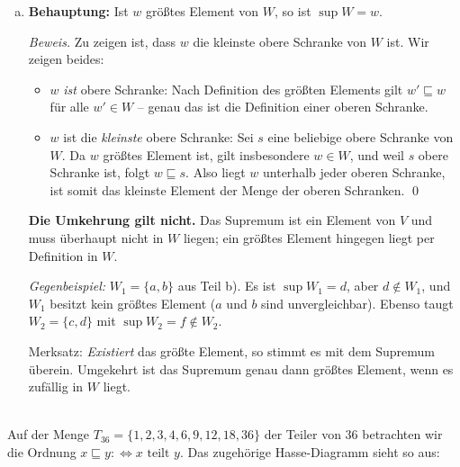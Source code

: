 \begin{loesung}
\begin{enumerate}[a)]
  Also existieren weder $\sup W_4$ noch $\inf W_4$.

  \textbf{Begründung für die fehlende obere Schranke:} $h$ ist ein isolierter Knoten, im Hasse-Diagramm läuft keine Kante zu $h$ hin oder von $h$ weg. Wegen Reflexivität ist $h$ nur mit sich selbst vergleichbar, d.h.\ $\uparrow\! h=\{h\}$. Eine obere Schranke $s$ von $W_4$ müsste $h\sqsubseteq s$ erfüllen, also $s=h$ sein; gleichzeitig müsste $a\sqsubseteq h$ gelten, was nicht der Fall ist. Es gibt daher keine obere Schranke -- und ohne obere Schranken erst recht keine kleinste, also kein Supremum.

  \item \textbf{Behauptung:} Ist $w$ größtes Element von $W$, so ist $\sup W=w$.

  \emph{Beweis.} Zu zeigen ist, dass $w$ die kleinste obere Schranke von $W$ ist. Wir zeigen beides:
  \begin{itemize}
    \item $w$ \emph{ist} obere Schranke: Nach Definition des größten Elements gilt $w'\sqsubseteq w$ für alle $w'\in W$ -- genau das ist die Definition einer oberen Schranke.
    \item $w$ ist die \emph{kleinste} obere Schranke: Sei $s$ eine beliebige obere Schranke von $W$. Da $w$ größtes Element ist, gilt insbesondere $w\in W$, und weil $s$ obere Schranke ist, folgt $w\sqsubseteq s$. Also liegt $w$ unterhalb jeder oberen Schranke, ist somit das kleinste Element der Menge der oberen Schranken. \qed
  \end{itemize}

  \textbf{Die Umkehrung gilt nicht.} Das Supremum ist ein Element von $V$ und muss überhaupt nicht in $W$ liegen; ein größtes Element hingegen liegt per Definition in $W$.

  \emph{Gegenbeispiel:} $W_1=\{a,b\}$ aus Teil b). Es ist $\sup W_1=d$, aber $d\notin W_1$, und $W_1$ besitzt kein größtes Element ($a$ und $b$ sind unvergleichbar). Ebenso taugt $W_2=\{c,d\}$ mit $\sup W_2=f\notin W_2$.

  Merksatz: \emph{Existiert} das größte Element, so stimmt es mit dem Supremum überein. Umgekehrt ist das Supremum genau dann größtes Element, wenn es zufällig in $W$ liegt.
\end{enumerate}
\end{loesung}

\\
Auf der Menge $T_{36}=\{1,2,3,4,6,9,12,18,36\}$ der Teiler von $36$ betrachten wir die Ordnung
$x\sqsubseteq y :\Leftrightarrow x \text{ teilt } y$. Das zugehörige Hasse-Diagramm sieht so aus:

